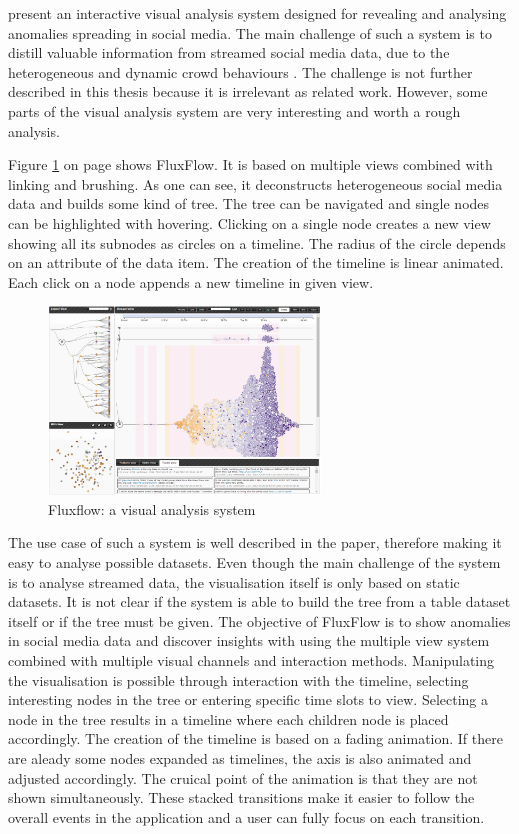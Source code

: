 \citeauthor{Zhao2014} present an interactive visual analysis system designed for revealing and analysing anomalies spreading in social media. The main challenge of such a system is to distill valuable information from streamed social media data, due to the heterogeneous and dynamic crowd behaviours . The challenge is not further described in this thesis because it is irrelevant as related work. However, some parts of the visual analysis system are very interesting and worth a rough analysis.

Figure \ref{fig:fluxflow} on page \pageref{fig:fluxflow} shows FluxFlow. It is based on multiple views combined with linking and brushing. As one can see, it deconstructs heterogeneous social media data and builds some kind of tree. The tree can be navigated and single nodes can be highlighted with hovering. Clicking on a single node creates a new view showing all its subnodes as circles on a timeline. The radius of the circle depends on an attribute of the data item. The creation of the timeline is linear animated. Each click on a node appends a new timeline in given view.

\begin{figure}[!htb]
\centering
\includegraphics[height=5cm]{images/methods/related/fluxflow.png}
\caption[
    Fluxflow: a visual analysis system .
]{Fluxflow: a visual analysis system}
\label{fig:fluxflow}
\end{figure}

The use case of such a system is well described in the paper, therefore making it easy to analyse possible datasets. Even though the main challenge of the system is to analyse streamed data, the visualisation itself is only based on static datasets. It is not clear if the system is able to build the tree from a table dataset itself or if the tree must be given.
\cbstart
The objective of FluxFlow is to show anomalies in social media data and discover insights with using the multiple view system combined with multiple visual channels and interaction methods. Manipulating the visualisation is possible through interaction with the timeline, selecting interesting nodes in the tree or entering specific time slots to view. Selecting a node in the tree results in a timeline where each children node is placed accordingly. The creation of the timeline is based on a fading animation. If there are aleady some nodes expanded as timelines, the axis is also animated and adjusted accordingly. The cruical point of the animation is that they are not shown simultaneously. These stacked transitions make it easier to follow the overall events in the application and a user can fully focus on each transition.
\cbend
